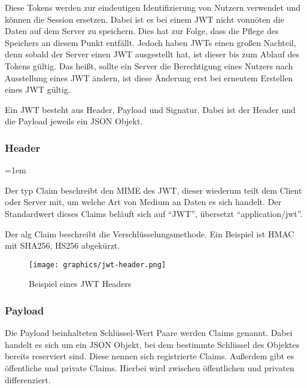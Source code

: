 Diese Tokens werden zur eindeutigen Identifizierung von Nutzern verwendet und können die Session ersetzen. Dabei ist es bei einem \gls{JWT} nicht vonnöten die Daten auf dem Server zu speichern. Dies hat zur Folge, dass die Pflege des Speichers an diesem Punkt entfällt. Jedoch haben \gls{JWT}s einen gro{\ss}en Nachteil, denn sobald der Server einen \gls{JWT} ausgestellt hat, ist dieser bis zum Ablauf des Tokens gültig. Das hei{\ss}t, sollte ein Server die Berechtigung eines Nutzers nach Ausstellung eines \gls{JWT} ändern, ist diese Änderung erst bei erneutem Erstellen eines \gls{JWT} gültig.

Ein \gls{JWT} besteht aus Header, Payload und Signatur. Dabei ist der Header und die Payload jeweils ein \gls{JSON} Objekt.

\subsubsection{Header}
\label{sec: jwt_header}


\begin{description}
	\leftskip=1em
	\item[typ] Der typ Claim beschreibt den \gls{MIME} des \gls{JWT}, dieser wiederum teilt dem Client oder Server mit, um welche Art von Medium an Daten es sich handelt. Der Standardwert dieses Claims beläuft sich auf \enquote{JWT}, übersetzt \enquote{application/jwt}.
	\item[alg] Der alg Claim beschreibt die Verschlüsselungsmethode. Ein Beispiel ist \gls{HMAC} mit \gls{SHA256}, HS256 abgekürzt.
\end{description}

\begin{figure}[h]
	\centering
	\texttt{[image: graphics/jwt-header.png]}
	\caption{Beispiel eines \gls{JWT} Headers }
	\label{fig:jwt-header}
\end{figure}

\subsubsection{Payload}
\label{sec: jwt-payload}

Die Payload beinhalteten Schlüssel-Wert Paare werden Claims genannt. Dabei handelt es sich um ein JSON Objekt, bei dem bestimmte Schlüssel des Objektes bereits reserviert sind. Diese nennen sich registrierte Claims. Au{\ss}erdem gibt es öffentliche und private Claims. Hierbei wird zwischen öffentlichen und privaten differenziert.

